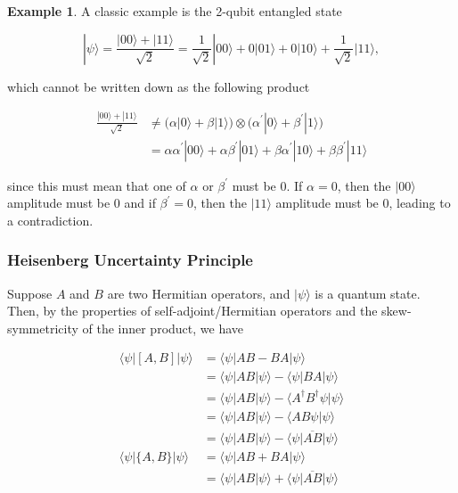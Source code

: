 \documentclass{article}
\theoremstyle{definition}
\newtheorem{example}{Example}[section]
\begin{document}
    \begin{example}
      A classic example is the 2-qubit entangled state

        \[|\psi \rangle = \frac{|00\rangle + |11 \rangle}{\sqrt{2}} = \frac{1}{\sqrt{2}} |00\rangle + 0 |01\rangle + 0 |10\rangle + \frac{1}{\sqrt{2}} |11\rangle,\]

      which cannot be written down as the following product

      \begin{align*}
        \frac{|00\rangle + |11 \rangle}{\sqrt{2}} & \neq \big(\alpha |0\rangle + \beta |1\rangle \big) \otimes \big( \alpha^\prime |0 \rangle + \beta^\prime |1\rangle \big) \\
        & = \alpha \alpha^\prime |00\rangle + \alpha \beta^\prime |01\rangle + \beta \alpha^\prime |10\rangle + \beta \beta^\prime |11\rangle
      \end{align*}

      since this must mean that one of $\alpha$ or $\beta^\prime$ must be $0$. If $\alpha = 0$, then the $|00\rangle$ amplitude must be $0$ and if $\beta^\prime = 0$, then the $|11\rangle$ amplitude must be $0$, leading to a contradiction.
    \end{example}

    \subsubsection{Heisenberg Uncertainty Principle}

      Suppose $A$ and $B$ are two Hermitian operators, and $|\psi \rangle$ is a quantum state. Then, by the properties of self-adjoint/Hermitian operators and the skew-symmetricity of the inner product, we have

      \begin{align*}
        \langle \psi | [A, B] | \psi \rangle & = \langle \psi | AB - BA | \psi \rangle \\
        & = \langle \psi | AB | \psi \rangle - \langle \psi | BA | \psi \rangle \\
        & = \langle \psi | AB | \psi \rangle - \langle A^\dagger B^\dagger \psi | \psi \rangle \\
        & = \langle \psi | AB | \psi \rangle - \langle A B \psi | \psi \rangle \\
        & = \langle \psi | AB | \psi \rangle - \overline{\langle \psi | AB  | \psi \rangle} \\
        \langle \psi | \{A, B\} | \psi \rangle & = \langle \psi | AB + BA | \psi \rangle \\
        & = \langle \psi | AB | \psi \rangle + \overline{\langle \psi | AB  | \psi \rangle}
      \end{align*}
\end{document}
